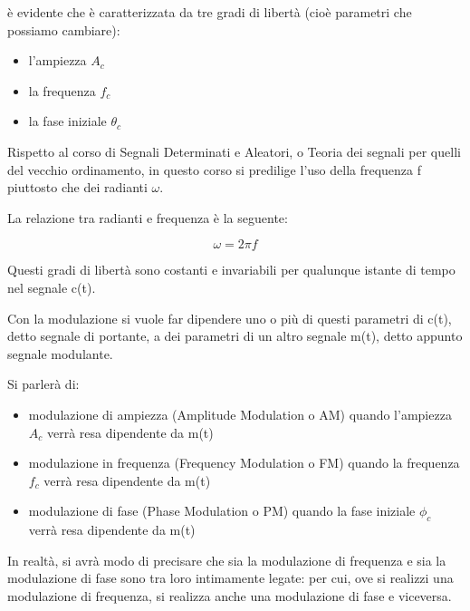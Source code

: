 è evidente che è caratterizzata da tre gradi di libertà (cioè parametri che possiamo cambiare): 

\begin{itemize}
    \item l'ampiezza $A_c$ 
    \item la frequenza $f_c$ 
    \item la fase iniziale $\theta_c$
\end{itemize}

\begin{tcolorbox}
    Rispetto al corso di Segnali Determinati e Aleatori, o Teoria dei segnali per quelli del vecchio ordinamento, 
    in questo corso si predilige l'uso della frequenza f piuttosto che dei radianti $\omega$. \newline
    
    La relazione tra radianti e frequenza è la seguente: 

    {
        \Large 
        \begin{equation}
            \omega = 2 \pi f
        \end{equation}

    }
    
\end{tcolorbox} 


Questi gradi di libertà sono costanti e invariabili per qualunque istante di tempo nel segnale c(t). \newline 

Con la modulazione si vuole far dipendere uno o più di questi parametri di c(t), detto segnale di portante, a dei parametri di un altro segnale m(t), 
detto appunto segnale modulante. \newline 

Si parlerà di: 

\begin{itemize}
    \item modulazione di ampiezza (Amplitude Modulation o AM) quando l'ampiezza $A_c$ verrà resa dipendente da m(t)
    \item modulazione in frequenza (Frequency Modulation o FM) quando la frequenza $f_c$ verrà resa dipendente da m(t)
    \item modulazione di fase (Phase Modulation o PM) quando la fase iniziale $\phi_c$ verrà resa dipendente da m(t)
\end{itemize}

In realtà, si avrà modo di precisare che sia la modulazione di frequenza e sia la modulazione di fase sono tra loro intimamente legate: 
per cui, ove si realizzi una modulazione di frequenza, si realizza anche una modulazione di fase e viceversa. \newline 

